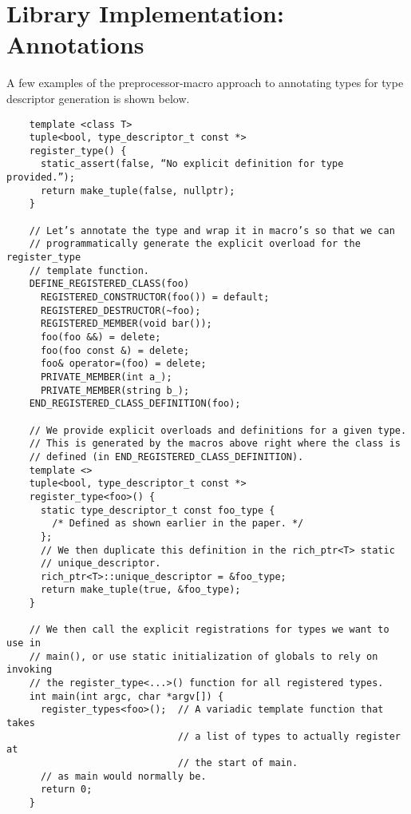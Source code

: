 \section{Library Implementation: Annotations}
\label{appendix:rich_ptr-annotations}

A few examples of the preprocessor-macro approach to annotating types for type
descriptor generation is shown below.

\begin{verbatim}
	template <class T>
	tuple<bool, type_descriptor_t const *>
	register_type() {
	  static_assert(false, “No explicit definition for type provided.”);
	  return make_tuple(false, nullptr);
	}

	// Let’s annotate the type and wrap it in macro’s so that we can
	// programmatically generate the explicit overload for the register_type
	// template function.
	DEFINE_REGISTERED_CLASS(foo)
	  REGISTERED_CONSTRUCTOR(foo()) = default;
	  REGISTERED_DESTRUCTOR(~foo);
	  REGISTERED_MEMBER(void bar());
	  foo(foo &&) = delete;
	  foo(foo const &) = delete;
	  foo& operator=(foo) = delete;
	  PRIVATE_MEMBER(int a_);
	  PRIVATE_MEMBER(string b_);
	END_REGISTERED_CLASS_DEFINITION(foo);

	// We provide explicit overloads and definitions for a given type.
	// This is generated by the macros above right where the class is
	// defined (in END_REGISTERED_CLASS_DEFINITION).
	template <>
	tuple<bool, type_descriptor_t const *>
	register_type<foo>() {
	  static type_descriptor_t const foo_type {
	    /* Defined as shown earlier in the paper. */
	  };
	  // We then duplicate this definition in the rich_ptr<T> static
	  // unique_descriptor.
	  rich_ptr<T>::unique_descriptor = &foo_type;
	  return make_tuple(true, &foo_type);
	}

	// We then call the explicit registrations for types we want to use in
	// main(), or use static initialization of globals to rely on invoking
	// the register_type<...>() function for all registered types.
	int main(int argc, char *argv[]) {
	  register_types<foo>();  // A variadic template function that takes 
	                          // a list of types to actually register at
	                          // the start of main.
	  // as main would normally be.
	  return 0;
	}
\end{verbatim}